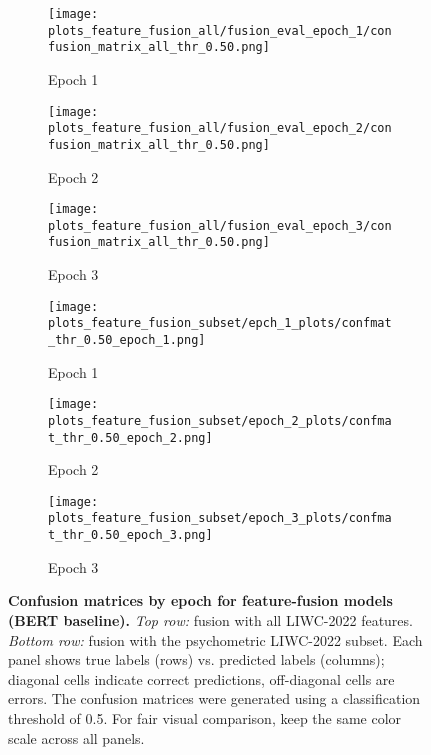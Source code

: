 \begin{figure}[H]
  \centering

  \begin{subfigure}[t]{0.32\textwidth}
    \centering
    \texttt{[image: plots\_feature\_fusion\_all/fusion\_eval\_epoch\_1/confusion\_matrix\_all\_thr\_0.50.png]}
    \caption{Epoch 1}
    \label{fig:ff_all_e1}
  \end{subfigure}\hfill
  \begin{subfigure}[t]{0.32\textwidth}
    \centering
    \texttt{[image: plots\_feature\_fusion\_all/fusion\_eval\_epoch\_2/confusion\_matrix\_all\_thr\_0.50.png]}
    \caption{Epoch 2}
    \label{fig:ff_all_e2}
  \end{subfigure}\hfill
  \begin{subfigure}[t]{0.32\textwidth}
    \centering
    \texttt{[image: plots\_feature\_fusion\_all/fusion\_eval\_epoch\_3/confusion\_matrix\_all\_thr\_0.50.png]}
    \caption{Epoch 3}
    \label{fig:ff_all_e3}
  \end{subfigure}

  \vspace{0.45cm}

  \begin{subfigure}[t]{0.32\textwidth}
    \centering
    \texttt{[image: plots\_feature\_fusion\_subset/epch\_1\_plots/confmat\_thr\_0.50\_epoch\_1.png]}
    \caption{Epoch 1}
    \label{fig:ff_psy_e1}
  \end{subfigure}\hfill
  \begin{subfigure}[t]{0.32\textwidth}
    \centering
    \texttt{[image: plots\_feature\_fusion\_subset/epoch\_2\_plots/confmat\_thr\_0.50\_epoch\_2.png]}
    \caption{Epoch 2}
    \label{fig:ff_psy_e2}
  \end{subfigure}\hfill
  \begin{subfigure}[t]{0.32\textwidth}
    \centering
    \texttt{[image: plots\_feature\_fusion\_subset/epoch\_3\_plots/confmat\_thr\_0.50\_epoch\_3.png]}
    \caption{Epoch 3}
    \label{fig:ff_psy_e3}
  \end{subfigure}

  \caption[Confusion matrices by epoch for feature-fusion models.]{\textbf{Confusion matrices by epoch for feature-fusion models (BERT baseline).}
  \emph{Top row:} fusion with all LIWC-2022 features. \emph{Bottom row:} fusion with the psychometric LIWC-2022 subset.
  Each panel shows true labels (rows) vs. predicted labels (columns); diagonal cells indicate correct predictions, off-diagonal cells are errors. The confusion matrices were generated using a classification threshold of 0.5.
  For fair visual comparison, keep the same color scale across all panels.}
  \label{fig:ff_confmats_epochs}
\end{figure}

